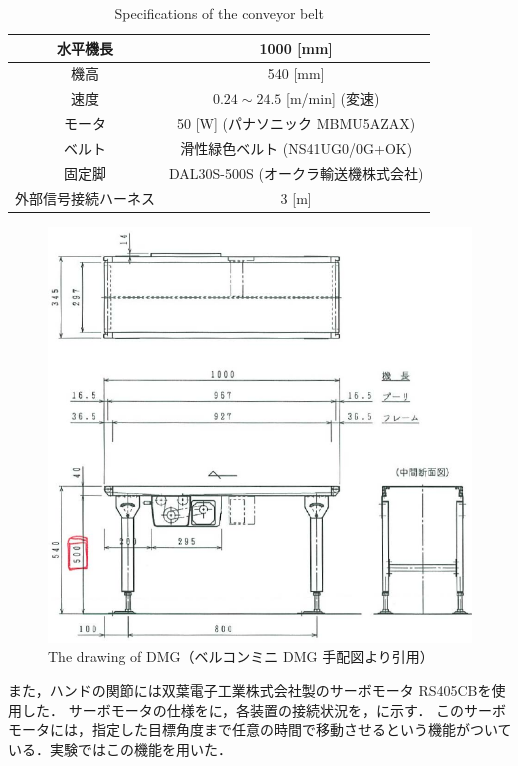 \documentclass[a4paper,twoside,12pt,papersize, dvipdfmx]{iirthesis}
\begin{document}
\begin{table}[b]
    \centering
    \caption{Specifications of the conveyor belt}
    \begin{tabular}{|c|c|}
    \hline
    水平機長 & 1000 [mm] \\
    \hline
    機高 & 540 [mm] \\
    \hline
    速度 & $0.24 \sim 24.5$ [m/min] (変速)\\
    \hline
    モータ & 50 [W] (パナソニック MBMU5AZAX) \\
    \hline
    ベルト & 滑性緑色ベルト (NS41UG0/0G+OK) \\
    \hline
    固定脚 & DAL30S-500S (オークラ輸送機株式会社)\\
    \hline
    外部信号接続ハーネス & 3 [m] \\
    \hline
    \end{tabular}
    \label{Specifications of the conveyor belt}
\end{table}
\begin{figure}[htbp]
    \centering
    \includegraphics[width=.8\columnwidth, clip]{fig/4-manipulation-result/blueprint.pdf}
    \caption{The drawing of DMG（ベルコンミニ DMG 手配図より引用）}
    \label{The drawing of DMG}
\end{figure}

また，ハンドの関節には双葉電子工業株式会社製のサーボモータ RS405CBを使用した．
サーボモータの仕様をに，各装置の接続状況を，に示す．
このサーボモータには，指定した目標角度まで任意の時間で移動させるという機能がついている．実験ではこの機能を用いた．
\end{document}

